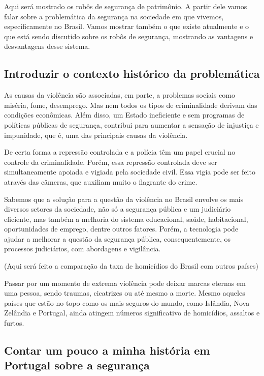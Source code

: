 \documentclass[12pt,a4paper]{article}
\begin{document}
    Aqui será mostrado os robôs de segurança de patrimônio. A partir dele vamos falar sobre a problemática da segurança na sociedade em que vivemos, especificamente no Brasil. Vamos mostrar também o que existe atualmente e o que está sendo discutido sobre os robôs de segurança, mostrando as vantagens e desvantagens desse sistema. 

    \subsection{Introduzir o contexto histórico da problemática}
    As causas da violência são associadas, em parte, a problemas sociais como miséria, fome, desemprego. Mas nem todos os tipos de criminalidade derivam das condições econômicas. Além disso, um Estado ineficiente e sem programas de políticas públicas de segurança, contribui para aumentar a sensação de injustiça e impunidade, que é, uma das principais causas da violência.

    De certa forma a repressão controlada e a polícia têm um papel crucial no controle da criminalidade. Porém, essa repressão controlada deve ser simultaneamente apoiada e vigiada pela sociedade civil. Essa vigia pode ser feito através das câmeras, que auxiliam muito o flagrante do crime.

    Sabemos que a solução para a questão da violência no Brasil envolve os mais diversos setores da sociedade, não só a segurança pública e um judiciário eficiente, mas também a melhoria do sistema educacional, saúde, habitacional, oportunidades de emprego, dentre outros fatores. Porém, a tecnologia pode ajudar a melhorar a questão da segurança pública, consequentemente, os processos judiciários, com abordagens e vigilância. 

    (Aqui será feito a comparação da taxa de homicídios
    do Brasil com outros países)

    Passar por um momento de extrema violência pode deixar marcas eternas em uma pessoa, sendo traumas, cicatrizes ou até mesmo a morte. Mesmo aqueles países que estão no topo como os mais seguros do mundo, como Islândia, Nova Zelândia e Portugal, ainda atingem números significativo de homicídios, assaltos e furtos.

    \subsection{Contar um pouco a minha história em Portugal sobre a segurança}
\end{document}
